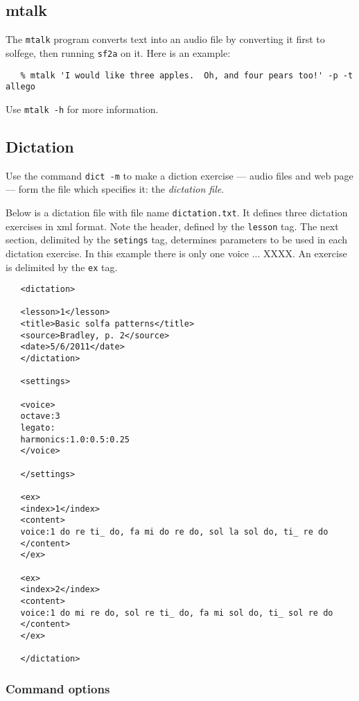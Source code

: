 \documentclass[11pt]{amsart}
\begin{document}
\subsection{mtalk}

The {\tt mtalk} program converts text into an audio file by converting
it first to solfege, then running {\tt sf2a} on it.  Here is an example:
\begin{verbatim}
   % mtalk 'I would like three apples.  Oh, and four pears too!' -p -t allego
\end{verbatim}
Use {\tt mtalk -h} for more information.


\subsection{Dictation}

Use the command {\tt dict -m} to make a diction exercise --- audio files
and web page --- form the file which specifies it: the \emph{dictation file}.

Below is a dictation file with file name {\tt dictation.txt}.  It defines
three dictation exercises in xml format.  Note the header, defined by the 
{\tt lesson} tag.  The next section, delimited by the {\tt setings} tag,
determines parameters to be used in each dictation exercise.  In this
example there is only one voice ... XXXX.  An exercise is delimited by the 
{\tt ex} tag.

\begin{verbatim}
   <dictation>
   
   <lesson>1</lesson>
   <title>Basic solfa patterns</title>
   <source>Bradley, p. 2</source>
   <date>5/6/2011</date>
   </dictation>
   
   <settings>
   
   <voice>
   octave:3
   legato:
   harmonics:1.0:0.5:0.25
   </voice>
   
   </settings>
   
   <ex>
   <index>1</index>
   <content>
   voice:1 do re ti_ do, fa mi do re do, sol la sol do, ti_ re do
   </content>
   </ex>
   
   <ex>
   <index>2</index>
   <content>
   voice:1 do mi re do, sol re ti_ do, fa mi sol do, ti_ sol re do
   </content>
   </ex>
   
   </dictation>
\end{verbatim}

\subsubsection{Command options}
\end{document}
